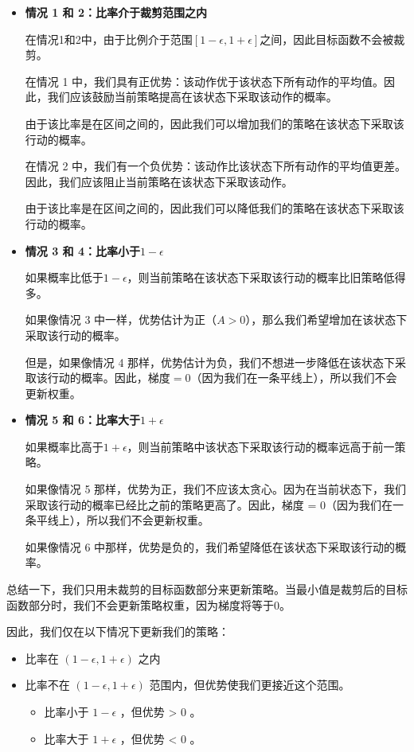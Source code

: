 \documentclass[lang=cn,newtx,10pt,scheme=chinese]{elegantbook}
\begin{document}
\begin{itemize}
\item \textbf{情况 1 和 2：比率介于裁剪范围之内}

在情况1和2中，由于比例介于范围$[1-\epsilon,1+\epsilon]$之间，因此目标函数不会被裁剪。

在情况 1 中，我们具有正优势：该动作优于该状态下所有动作的平均值。因此，我们应该鼓励当前策略提高在该状态下采取该动作的概率。

由于该比率是在区间之间的，因此我们可以增加我们的策略在该状态下采取该行动的概率。

在情况 2 中，我们有一个负优势：该动作比该状态下所有动作的平均值更差。因此，我们应该阻止当前策略在该状态下采取该动作。

由于该比率是在区间之间的，因此我们可以降低我们的策略在该状态下采取该行动的概率。

\item \textbf{情况 3 和 4：比率小于$1-\epsilon$}

如果概率比低于$1-\epsilon$，则当前策略在该状态下采取该行动的概率比旧策略低得多。

如果像情况 3 中一样，优势估计为正（$A>0$），那么我们希望增加在该状态下采取该行动的概率。

但是，如果像情况 4 那样，优势估计为负，我们不想进一步降低在该状态下采取该行动的概率。因此，$\text{梯度} = 0$（因为我们在一条平线上），所以我们不会更新权重。

\item \textbf{情况 5 和 6：比率大于$1+\epsilon$}

如果概率比高于$1+\epsilon$，则当前策略中该状态下采取该行动的概率远高于前一策略。

如果像情况 5 那样，优势为正，我们不应该太贪心。因为在当前状态下，我们采取该行动的概率已经比之前的策略更高了。因此，梯度 = 0（因为我们在一条平线上），所以我们不会更新权重。

如果像情况 6 中那样，优势是负的，我们希望降低在该状态下采取该行动的概率。
\end{itemize}


总结一下，我们只用未裁剪的目标函数部分来更新策略。当最小值是裁剪后的目标函数部分时，我们不会更新策略权重，因为梯度将等于0。

因此，我们仅在以下情况下更新我们的策略：

\begin{itemize}
\item 比率在 $(1-\epsilon,1+\epsilon)$ 之内
\item 比率不在 $(1-\epsilon,1+\epsilon)$ 范围内，但优势使我们更接近这个范围。
\begin{itemize}
	\item 比率小于 $1-\epsilon$ ，但优势 > 0 。
	\item 比率大于 $1+\epsilon$ ，但优势 < 0 。
\end{itemize}
\end{itemize}
\end{document}
